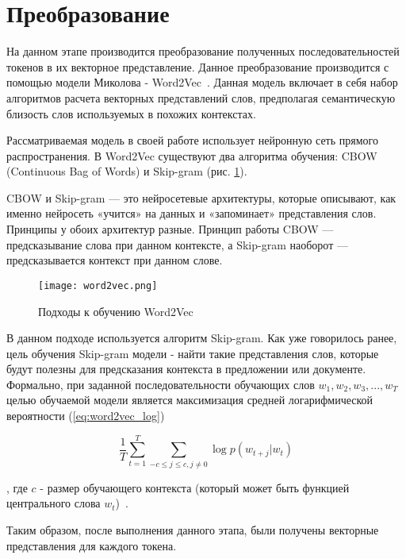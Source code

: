 \section{Преобразование}

На данном этапе производится преобразование полученных последовательностей токенов в их векторное представление. Данное преобразование производится с помощью модели Миколова - Word2Vec~\cite{word2vec}. Данная модель включает в себя набор алгоритмов расчета векторных представлений слов, предполагая семантическую близость слов используемых в похожих контекстах.

Рассматриваемая модель в своей работе использует нейронную сеть прямого распространения. В Word2Vec существуют два алгоритма обучения: CBOW (Continuous Bag of Words) и Skip-gram (рис. \ref{fig:word2vec}).


CBOW и Skip-gram — это нейросетевые архитектуры, которые описывают, как именно нейросеть «учится» на данных и «запоминает» представления слов. Принципы у обоих архитектур разные. Принцип работы CBOW — предсказывание слова при данном контексте, а Skip-gram наоборот — предсказывается контекст при данном слове.

\begin{figure}[htbp]
\centering
\texttt{[image: word2vec.png]}
\caption{Подходы к обучению Word2Vec}
\label{fig:word2vec}
\end{figure}

В данном подходе используется алгоритм Skip-gram. Как уже говорилось ранее, цель обучения Skip-gram модели - найти такие представления слов, которые будут полезны для предсказания контекста в предложении или документе. Формально, при заданной последовательности обучающих слов \(w_1, w_2, w_3,...,w_T\) целью обучаемой модели является максимизация средней логарифмической вероятности (\ref{eq:word2vec_log})

\begin{equation}
\label{eq:word2vec_log}
\frac{1}{T}\sum_{t=1}^{T}\sum_{-c \leq j \leq c,j\neq0}\log p(w_{t+j}|w_t)
\end{equation}

, где \(c\) - размер обучающего контекста (который может быть функцией центрального слова \(w_t\))~\cite{word2vec}.

Таким образом, после выполнения данного этапа, были получены векторные представления для каждого токена.
